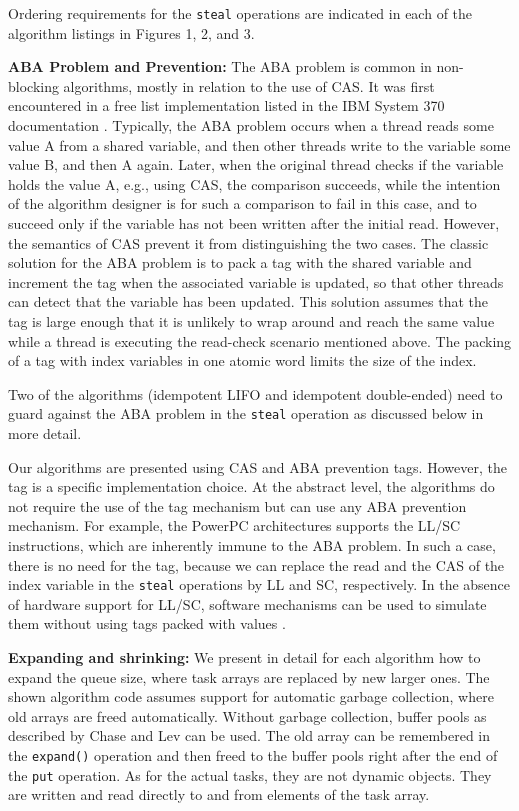 Ordering requirements for the \lstinline!steal! operations are
indicated in each of the algorithm listings in Figures 1, 2, and 3.

\textbf{ABA Problem and Prevention:} The ABA problem is common in
non-blocking algorithms, mostly in relation to the use of CAS. It was
first encountered in a free list implementation listed in the IBM
System 370 documentation \cite{IBM1974}. Typically, the ABA problem
occurs when a thread reads some value A from a shared variable, and
then other threads write to the variable some value B, and then A
again. Later, when the original thread checks if the variable holds
the value A, e.g., using CAS, the comparison succeeds, while the
intention of the algorithm designer is for such a comparison to fail
in this case, and to succeed only if the variable has not been written
after the initial read. However, the semantics of CAS prevent it from
distinguishing the two cases. The classic solution for the ABA problem
\cite{IBM1974} is to pack a tag with the shared variable and increment
the tag when the associated variable is updated, so that other threads
can detect that the variable has been updated. This solution assumes
that the tag is large enough that it is unlikely to wrap around and
reach the same value while a thread is executing the read-check
scenario mentioned above. The packing of a tag with index variables in
one atomic word limits the size of the index.

Two of the algorithms (idempotent LIFO and idempotent double-ended)
need to guard against the ABA problem in the \lstinline!steal!
operation as discussed below in more detail.

Our algorithms are presented using CAS and ABA prevention
tags. However, the tag is a specific implementation choice. At the
abstract level, the algorithms do not require the use of the tag
mechanism but can use any ABA prevention mechanism. For example, the
PowerPC architectures supports the LL/SC instructions, which are
inherently immune to the ABA problem. In such a case, there is no need
for the tag, because we can replace the read and the CAS of the index
variable in the \lstinline!steal! operations by LL and SC,
respectively. In the absence of hardware support for LL/SC, software
mechanisms can be used to simulate them without using tags packed with
values \cite{Moir1997}.

\textbf{Expanding and shrinking:} We present in detail for each
algorithm how to expand the queue size, where task arrays are replaced
by new larger ones. The shown algorithm code assumes support for
automatic garbage collection, where old arrays are freed
automatically. Without garbage collection, buffer pools as described
by Chase and Lev \cite{Chase2005} can be used. The old array can be
remembered in the \lstinline!expand()! operation and then freed to the
buffer pools right after the end of the \lstinline!put! operation. As
for the actual tasks, they are not dynamic objects. They are written
and read directly to and from elements of the task array.

